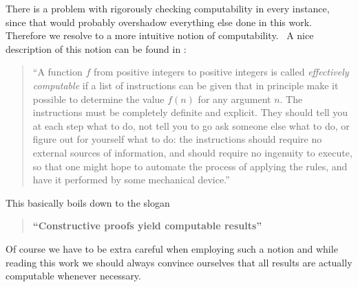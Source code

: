 There is a problem with rigorously checking computability in every instance, since that would probably overshadow everything else done in this work.
Therefore we resolve to a more intuitive notion of computability.\footnotemark~
A nice description of this notion can be found in \cite{bbj07}:
\begin{quotation}
	``A function $f$ from positive integers to positive integers is called \emph{effectively computable} if a list of instructions can be given that in principle make it possible to determine the value $f(n)$ for any argument $n$. The instructions must be completely definite and explicit. They should tell you at each step what to do, not tell you to go ask someone else what to do, or figure out for yourself what to do: the instructions should require no external sources of information, and should require no ingenuity to execute, so that one might hope to automate the process of applying the rules, and have it performed by some mechanical device.''
\end{quotation}
This basically boils down to the slogan
\begin{quotation}
	\textbf{``Constructive proofs yield computable results''}
\end{quotation}
Of course we have to be extra careful when employing such a notion and while reading this work we should always convince ourselves that all results are actually computable whenever necessary.
